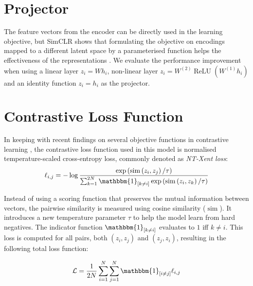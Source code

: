 \section{Projector}
The feature vectors from the encoder can be directly used in the learning objective, but SimCLR shows that formulating the objective on encodings mapped to a different latent space by a parameterised function helps the effectiveness of the representations \cite{chen_simple_2020}.
We evaluate the performance improvement when using a linear layer $z_i = Wh_i$, non-linear layer $z_i = W^{(2)}\operatorname{ReLU}(W^{(1)}h_i)$ and an identity function $z_i = h_i$ as the projector.


\section{Contrastive Loss Function}
In keeping with recent findings on several objective functions in contrastive learning \cite{chen_simple_2020}, the contrastive loss function used in this model is normalised temperature-scaled cross-entropy loss, commonly denoted as \emph{NT-Xent loss}:
\begin{equation}
    \label{ntxent_loss}
    \ell_{i, j}=-\log \frac{\exp \left(\operatorname{sim}\left(z_{i}, z_{j}\right) / \tau\right)}{\sum_{k=1}^{2 N} \mathbbm{1}_{[k \neq i]} \exp \left(\operatorname{sim}\left(z_{i}, z_{k}\right) / \tau\right)}
\end{equation}

Instead of using a scoring function that preserves the mutual information between vectors, the pairwise similarity is measured using cosine similarity ($\operatorname{sim}$).
It introduces a new temperature parameter $\tau$ to help the model learn from hard negatives.
The indicator function $\mathbbm{1}_{[k \neq i]}$ evaluates to $1$ iff $k\neq i$.
This loss is computed for all pairs, both $(z_i, z_j)$ and $(z_j, z_i)$, resulting in the following total loss function:

\begin{equation}
    \label{total_xent_loss}
    \mathcal{L} = \frac{1}{2N}\sum_{i=1}^{N}\sum_{j=1}^{N} \mathbbm{1}_{[i\neq j]}\ell_{i, j}
\end{equation}

